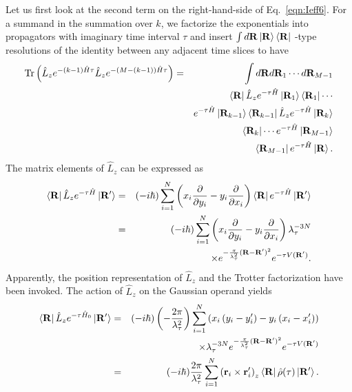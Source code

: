 \documentclass[12pt]{iopart}
\begin{document}
Let us first look at the second term on the right-hand-side of Eq.~\ref{eqn:Ieff6}. 
For a summand in the summation over $k$, 
we factorize the exponentials into propagators with imaginary time interval $\tau$ and insert  $\int d {\bf R} \left| {\bf R} \right>\left< {\bf R} \right|$ -type resolutions of the identity between any adjacent time slices to have
\begin{eqnarray}
{\rm Tr}\left( \hat{L}_ze^{-(k-1)\hat{H}\tau}\hat{L}_ze^{-(M-(k-1))\hat{H}\tau} \right)&=&\int d{\bf R} d{\bf R}_1 \cdots d{\bf R}_{M-1} \nonumber\\
&&\left<{\bf R}\right|\hat{L}_ze^{-\tau\hat{H}}\left|{\bf R}_1\right>\left<{\bf R}_1\right|\cdots \nonumber\\
&&e^{-\tau\hat{H}}\left|{\bf R}_{k-1}\right>\left<{\bf R}_{k-1}\right|\hat{L}_ze^{-\tau\hat{H}}\left|{\bf R}_k\right>\nonumber\\
&&\left<{\bf R}_k\right|\cdots e^{-\tau\hat{H}}\left|{\bf R}_{M-1}\right>\nonumber\\
&&\left<{\bf R}_{M-1}\right|e^{-\tau\hat{H}}\left|{\bf R}\right>. \label{eqn:term_k}
\end{eqnarray}
The matrix elements of $\hat{L}_z$ can be expressed as
\begin{eqnarray}
\left<{\bf R}\right|\hat{L}_ze^{-\tau\hat{H}}\left|{\bf R}'\right>&=&(-i\hbar)\sum_{i=1}^N\left(x_i\frac{\partial}{\partial y_i}-y_i\frac{\partial}{\partial x_i} \right)\left<{\bf R}\right|e^{-\tau\hat{H}}\left|{\bf R}'\right>\nonumber\\
&=&(-i\hbar)\sum_{i=1}^N\left(x_i\frac{\partial}{\partial y_i}-y_i\frac{\partial}{\partial x_i} \right)\lambda_{\tau}^{-3N} \nonumber\\
&&\times e^{-\frac{\pi}{\lambda_\tau^2}({\bf R}-{\bf R}')^2}e^{-\tau V({\bf R}')}. \label{eqn:lzmat}
\end{eqnarray}
Apparently, the position representation of $\hat{L}_z$ and the Trotter factorization have been invoked. The action of $\hat{L}_{z}$ on the Gaussian operand yields 
\begin{eqnarray}
\left<{\bf R}\right|\hat{L}_ze^{-\tau\hat{H}_0}\left|{\bf R}'\right>&=&(-i\hbar)\left( -\frac{2\pi}{\lambda_\tau^2} \right)\sum_{i=1}^N\left( x_i\left(y_i-y_i' \right)-y_i\left(x_i-x_i' \right) \right) \nonumber\\
&&\times \lambda_{\tau}^{-3N}e^{-\frac{\pi}{\lambda_\tau^2}({\bf R}-{\bf R}')^2}e^{-\tau V({\bf R}')}\nonumber\\
&=&(-i\hbar)\frac{2\pi}{\lambda_\tau^2} \sum_{i=1}^N\left({\bf r}_i\times{\bf r}_i' \right)_z\left<{\bf R}\right|\hat{\rho}(\tau)\left|{\bf R}'\right>.
\end{eqnarray}
\end{document}
